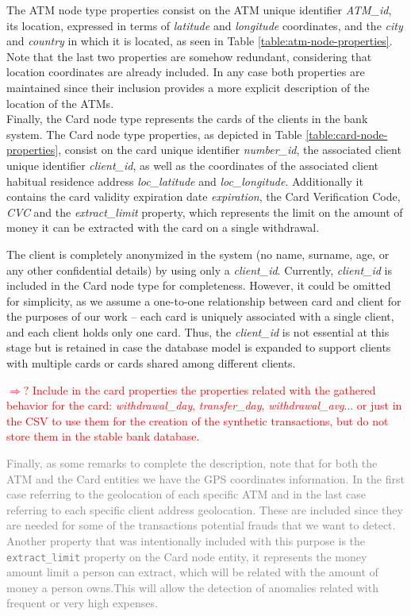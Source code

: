 \documentclass{article}
\begin{document}


The ATM node type properties consist on the ATM unique identifier \emph{ATM\_id}, its location, expressed in terms of \emph{latitude} and \emph{longitude} coordinates, and the \emph{city} and 
\emph{country} in which it is located, as seen in Table \ref{table:atm-node-properties}.
Note that the last two properties are somehow redundant, considering that location coordinates
are already included. In any case both properties are maintained since their inclusion provides a more explicit description of the location of the ATMs.\\

Finally, the Card node type represents the cards of the clients in the bank system. The Card node type properties, as depicted in Table
\ref{table:card-node-properties}, consist on the card unique 
identifier \emph{number\_id}, the associated client unique identifier \emph{client\_id}, as well
as the coordinates of the associated client habitual residence address \emph{loc\_latitude} and 
\emph{loc\_longitude}. Additionally it contains the card validity expiration date \emph{expiration}, the Card Verification Code, \emph{CVC} and the \emph{extract\_limit} property, which represents the limit on the amount of money it can be extracted with the card on a single withdrawal.



The client is completely anonymized in the system (no name, surname, age, or any other confidential details) by using only a \emph{client\_id}. Currently, \emph{client\_id} is included in the Card node type for completeness. However, it could be omitted for simplicity, as we assume a one-to-one relationship between card and client for the purposes of our work -- each card is uniquely associated with a single client, and each client holds only one card. Thus, the \emph{client\_id} is not essential at this stage but is retained in case the database model is expanded to support clients with multiple cards or cards shared among different clients.

\textcolor{red}{$\Rightarrow ?$ Include in the card properties the properties related with the
gathered behavior for the card: \emph{withdrawal\_day}, \emph{transfer\_day}, 
\emph{withdrawal\_avg}... or just in the CSV to use them for the creation of the synthetic
transactions, but do not store them in the stable bank database}.


\textcolor{gray}{
Finally, as some remarks to complete the description, note that for both the ATM and the Card entities we have the GPS coordinates information. In the first case referring to the geolocation of each specific ATM and in the last case referring to each specific client address geolocation. These are included since they are needed for some of the transactions potential frauds that we want to detect.
Another property that was intentionally included with this purpose is the \texttt{extract\_limit} property on the Card node entity, it represents the money amount limit a person can extract, which will be related with the amount of money a person owns.This will allow the detection of anomalies related with frequent or very high expenses. 
}
\end{document}
